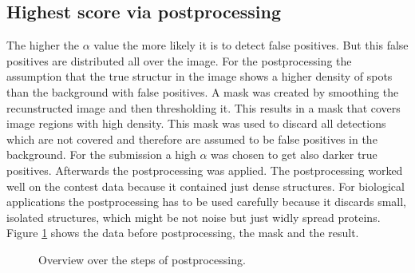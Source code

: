 \subsection{Highest score via postprocessing}
The higher the $\alpha$ value the more likely it is to detect false positives. But this false positives are distributed all over the image. For the postprocessing the assumption that the true structur in the image shows a higher density of spots than the background with false positives. A mask was created by smoothing the recunstructed image and then thresholding it. This results in a mask that covers image regions with high density. This mask was used to discard all detections which are not covered and therefore are assumed to be false positives in the background.\newline
For the submission a high $\alpha$ was chosen to get also darker true positives. Afterwards the postprocessing was applied. The postprocessing worked well on the contest data because it contained just dense structures. For biological applications the postprocessing has to be used carefully because it discards small, isolated structures, which might be not noise but just widly spread proteins.\newline
Figure \ref{postproc} shows the data before postprocessing, the mask and the result.
\begin{figure}
\hfill
{}\hfill	
{}

\caption{Overview over the steps of postprocessing.}
\label{postproc}	

\end{figure}


